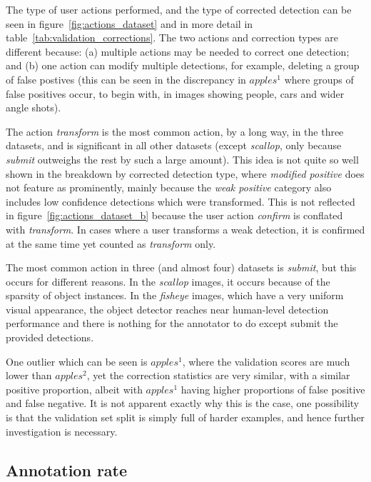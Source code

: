 The type of user actions performed, and the type of corrected detection can be seen in figure~\ref{fig:actions_dataset} and in more detail in table~\ref{tab:validation_corrections}. The two actions and correction types are different because: (a) multiple actions may be needed to correct one detection; and (b) one action can modify multiple detections, for example, deleting a group of false postives (this can be seen in the discrepancy in $apples^1$ where groups of false positives occur, to begin with, in images showing people, cars and wider angle shots). 

The action \emph{transform} is the most common action, by a long way, in the three datasets, and is significant in all other datasets (except \emph{scallop}, only because \emph{submit} outweighs the rest by such a large amount). This idea is not quite so well shown in the breakdown by corrected detection type, where \emph{modified positive} does not feature as prominently, mainly because the \emph{weak positive} category also includes low confidence detections which were transformed. This is not reflected in figure~\ref{fig:actions_dataset_b} because the user action \emph{confirm} is conflated with \emph{transform}. In cases where a user transforms a weak detection, it is confirmed at the same time yet counted as \emph{transform} only.

The most common action in three (and almost four) datasets is \emph{submit}, but this occurs for different reasons. In the \emph{scallop} images, it occurs because of the sparsity of object instances. In the \emph{fisheye} images, which have a very uniform visual appearance, the object detector reaches near human-level detection performance and there is nothing for the annotator to do except submit the provided detections.

One outlier which can be seen is $apples^1$, where the validation scores are much lower than $apples^2$, yet the correction statistics are very similar, with a similar positive proportion, albeit with $apples^1$ having higher proportions of false positive and false negative. It is not apparent exactly why this is the case, one possibility is that the validation set split is simply full of harder examples, and hence further investigation is necessary.

\subsection{Annotation rate}
\label{sec:annotation_rate}

